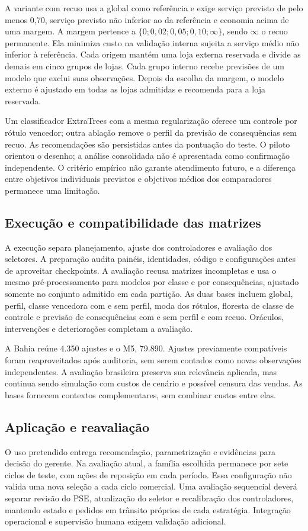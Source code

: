A variante com recuo usa a global como referência e exige serviço previsto de pelo menos 0,70, serviço previsto não inferior ao da referência e economia acima de uma margem. A margem pertence a $\{0;0{,}02;0{,}05;0{,}10;\infty\}$, sendo $\infty$ o recuo permanente. Ela minimiza custo na validação interna sujeita a serviço médio não inferior à referência. Cada origem mantém uma loja externa reservada e divide as demais em cinco grupos de lojas. Cada grupo interno recebe previsões de um modelo que exclui suas observações. Depois da escolha da margem, o modelo externo é ajustado em todas as lojas admitidas e recomenda para a loja reservada.

Um classificador ExtraTrees com a mesma regularização oferece um controle por rótulo vencedor; outra ablação remove o perfil da previsão de consequências sem recuo. As recomendações são persistidas antes da pontuação do teste. O piloto orientou o desenho; a análise consolidada não é apresentada como confirmação independente. O critério empírico não garante atendimento futuro, e a diferença entre objetivos individuais previstos e objetivos médios dos comparadores permanece uma limitação.

\subsection{Execução e compatibilidade das matrizes}
A execução separa planejamento, ajuste dos controladores e avaliação dos seletores. A preparação audita painéis, identidades, código e configurações antes de aproveitar checkpoints. A avaliação recusa matrizes incompletas e usa o mesmo pré-processamento para modelos por classe e por consequências, ajustado somente no conjunto admitido em cada partição. As duas bases incluem global, perfil, classe vencedora com e sem perfil, moda dos rótulos, floresta de classe de controle e previsão de consequências com e sem perfil e com recuo. Oráculos, intervenções e deteriorações completam a avaliação.

A Bahia reúne 4.350 ajustes e o M5, 79.890. Ajustes previamente compatíveis foram reaproveitados após auditoria, sem serem contados como novas observações independentes. A avaliação brasileira preserva sua relevância aplicada, mas continua sendo simulação com custos de cenário e possível censura das vendas. As bases fornecem contextos complementares, sem combinar custos entre elas.

\subsection{Aplicação e reavaliação}
\label{sec:aplicacao_aipe}
O uso pretendido entrega recomendação, parametrização e evidências para decisão do gerente. Na avaliação atual, a família escolhida permanece por sete ciclos de teste, com ações de reposição em cada período. Essa configuração não valida uma nova seleção a cada ciclo comercial. Uma avaliação sequencial deverá separar revisão do PSE, atualização do seletor e recalibração dos controladores, mantendo estado e pedidos em trânsito próprios de cada estratégia. Integração operacional e supervisão humana exigem validação adicional.

